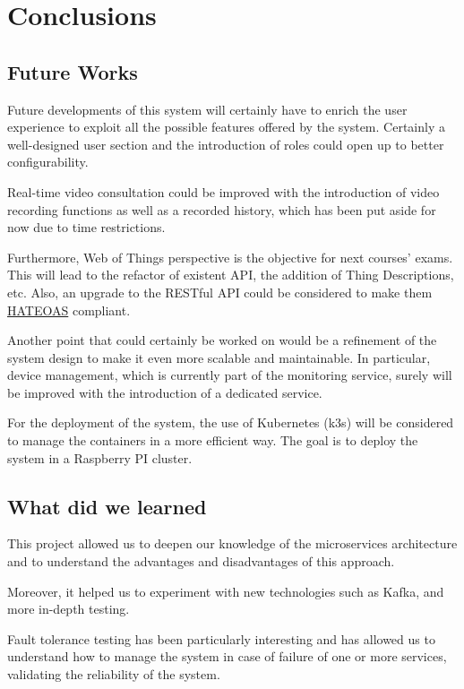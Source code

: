 \documentclass{scrartcl}
\begin{document}
    \section{Conclusions}

    \subsection{Future Works}

    Future developments of this system will certainly have to enrich the user experience to exploit all the possible features offered by the system.
    Certainly a well-designed user section and the introduction of roles could open up to better configurability.

    Real-time video consultation could be improved with the introduction of video recording functions as well as a recorded history,
    which has been put aside for now due to time restrictions.

    Furthermore, Web of Things perspective is the objective for next courses' exams.
    This will lead to the refactor of existent API, the addition of Thing Descriptions, etc.
    Also, an upgrade to the RESTful API could be considered to make them \href{https://en.wikipedia.org/wiki/HATEOAS}{HATEOAS} compliant.

    Another point that could certainly be worked on would be a refinement of the system design to make it even more scalable and maintainable.
    In particular, device management, which is currently part of the monitoring service, surely will be improved with the introduction of a dedicated service.

    For the deployment of the system, the use of Kubernetes (k3s) will be considered to manage the containers in a more efficient way.
    The goal is to deploy the system in a Raspberry PI cluster.

    \subsection{What did we learned}

    This project allowed us to deepen our knowledge of the microservices architecture and to understand the advantages and disadvantages of this approach.

    Moreover, it helped us to experiment with new technologies such as Kafka, and more in-depth testing.

    Fault tolerance testing has been particularly interesting and has allowed us to understand how to manage the system in case of failure of one or more services, validating the reliability of the system.

%    
\end{document}
